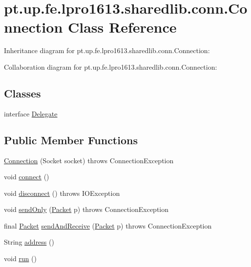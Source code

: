 \hypertarget{classpt_1_1up_1_1fe_1_1lpro1613_1_1sharedlib_1_1conn_1_1_connection}{}\section{pt.\+up.\+fe.\+lpro1613.\+sharedlib.\+conn.\+Connection Class Reference}
\label{classpt_1_1up_1_1fe_1_1lpro1613_1_1sharedlib_1_1conn_1_1_connection}


Inheritance diagram for pt.\+up.\+fe.\+lpro1613.\+sharedlib.\+conn.\+Connection\+:


Collaboration diagram for pt.\+up.\+fe.\+lpro1613.\+sharedlib.\+conn.\+Connection\+:
\subsection*{Classes}
\begin{DoxyCompactItemize}
\item 
interface \hyperlink{interfacept_1_1up_1_1fe_1_1lpro1613_1_1sharedlib_1_1conn_1_1_connection_1_1_delegate}{Delegate}
\end{DoxyCompactItemize}
\subsection*{Public Member Functions}
\begin{DoxyCompactItemize}
\item 
\hyperlink{classpt_1_1up_1_1fe_1_1lpro1613_1_1sharedlib_1_1conn_1_1_connection_ad3c3b594a0c16b3b95f504039700a876}{Connection} (Socket socket)  throws Connection\+Exception 
\item 
void \hyperlink{classpt_1_1up_1_1fe_1_1lpro1613_1_1sharedlib_1_1conn_1_1_connection_a8ccfed3defecf3a4070c32a0f3d6acb7}{connect} ()
\item 
void \hyperlink{classpt_1_1up_1_1fe_1_1lpro1613_1_1sharedlib_1_1conn_1_1_connection_a3f57700e6cf5cb4ae80ce06db37ab0fc}{disconnect} ()  throws I\+O\+Exception 
\item 
void \hyperlink{classpt_1_1up_1_1fe_1_1lpro1613_1_1sharedlib_1_1conn_1_1_connection_acdcf8af7c9a37ede122c6db80d06668f}{send\+Only} (\hyperlink{classpt_1_1up_1_1fe_1_1lpro1613_1_1sharedlib_1_1conn_1_1_packet}{Packet} p)  throws Connection\+Exception 
\item 
final \hyperlink{classpt_1_1up_1_1fe_1_1lpro1613_1_1sharedlib_1_1conn_1_1_packet}{Packet} \hyperlink{classpt_1_1up_1_1fe_1_1lpro1613_1_1sharedlib_1_1conn_1_1_connection_ac70216d1f9f5ed2c8b29431b10108620}{send\+And\+Receive} (\hyperlink{classpt_1_1up_1_1fe_1_1lpro1613_1_1sharedlib_1_1conn_1_1_packet}{Packet} p)  throws Connection\+Exception 
\item 
String \hyperlink{classpt_1_1up_1_1fe_1_1lpro1613_1_1sharedlib_1_1conn_1_1_connection_a58903a343693acbe946d4ad23eb29bd4}{address} ()
\item 
void \hyperlink{classpt_1_1up_1_1fe_1_1lpro1613_1_1sharedlib_1_1conn_1_1_connection_ad2971acbca89cf81dcb5fe0ece0a53c4}{run} ()
\end{DoxyCompactItemize}
